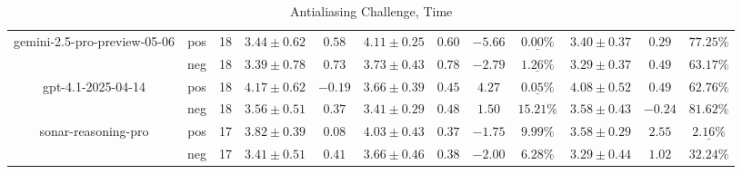 \begin{table}[ht!]
{\begin{tabular}{| c || c | c || c | c || c | c | c | c || c | c | c ||}
      gemini-2.5-pro-preview-05-06
        & pos
        & 18
        & $3.44 \pm 0.62$
        & $0.58$
        & $4.11 \pm 0.25$
        & $0.60$
        & $-5.66$
        & $\underline{\mathbf{0.00\%}}$
        & $3.40 \pm 0.37$
        & $0.29$
        & $77.25\text{\%}$ \\
        & neg
        & 18
        & $3.39 \pm 0.78$
        & $0.73$
        & $3.73 \pm 0.43$
        & $0.78$
        & $-2.79$
        & $\underline{\mathbf{1.26\%}}$
        & $3.29 \pm 0.37$
        & $0.49$
        & $63.17\text{\%}$ \\
    \hline


      gpt-4.1-2025-04-14
        & pos
        & 18
        & $4.17 \pm 0.62$
        & $-0.19$
        & $3.66 \pm 0.39$
        & $0.45$
        & $4.27$
        & $\underline{\mathbf{0.05\%}}$
        & $4.08 \pm 0.52$
        & $0.49$
        & $62.76\text{\%}$ \\
        & neg
        & 18
        & $3.56 \pm 0.51$
        & $0.37$
        & $3.41 \pm 0.29$
        & $0.48$
        & $1.50$
        & $15.21\text{\%}$
        & $3.58 \pm 0.43$
        & $-0.24$
        & $81.62\text{\%}$ \\
    \hline


      sonar-reasoning-pro
        & pos
        & 17
        & $3.82 \pm 0.39$
        & $0.08$
        & $4.03 \pm 0.43$
        & $0.37$
        & $-1.75$
        & $9.99\text{\%}$
        & $3.58 \pm 0.29$
        & $2.55$
        & $\underline{\mathbf{2.16\%}}$ \\
        & neg
        & 17
        & $3.41 \pm 0.51$
        & $0.41$
        & $3.66 \pm 0.46$
        & $0.38$
        & $-2.00$
        & $6.28\text{\%}$
        & $3.29 \pm 0.44$
        & $1.02$
        & $32.24\text{\%}$ \\
    \hline


      \hline
    \end{tabular}
  }
  \caption{Antialiasing Challenge, Time}
  \label{tbleval-distortion-time_score}
\end{table}


